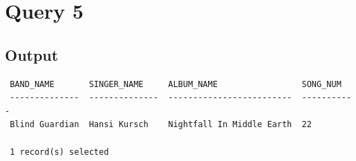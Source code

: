 \documentclass{report}
\begin{document}
\section*{Query 5}
\subsection*{Output}
\begin{verbatim}
 BAND_NAME       SINGER_NAME     ALBUM_NAME                 SONG_NUM    
 --------------  --------------  -------------------------  ----------- 
 Blind Guardian  Hansi Kursch    Nightfall In Middle Earth  22          

 1 record(s) selected
\end{verbatim}
\end{document}
